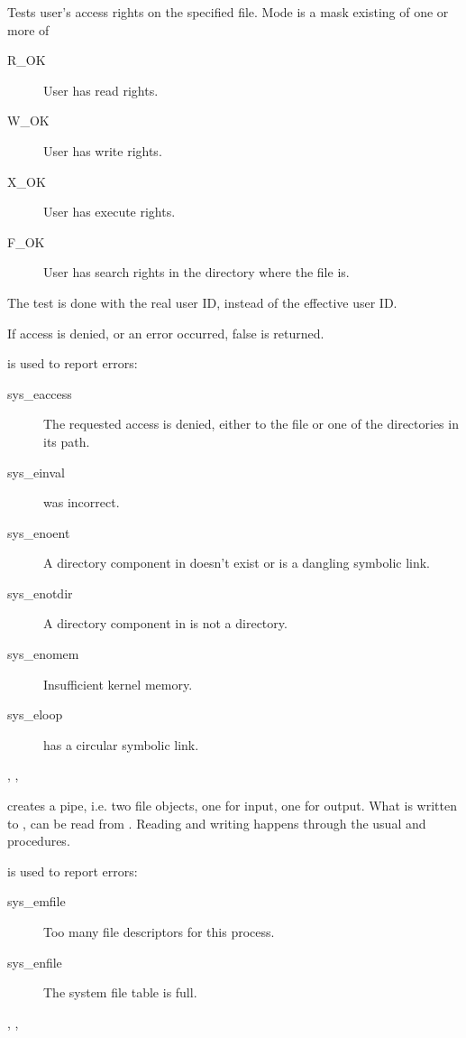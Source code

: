 {
Tests user's access rights on the specified file. Mode is a mask existing of
one or more of
\begin{description}
\item[R\_OK] User has read rights.
\item[W\_OK] User has write rights.
\item[X\_OK] User has execute rights.
\item[F\_OK] User has search rights in the directory where the file is.
\end{description}
The test is done with the real user ID, instead of the effective user ID.

If access is denied, or an error occurred, false is returned.
}
{  is used to report errors:
\begin{description}
\item[sys\_eaccess] The requested access is denied, either to the file or one
of the directories in its path.
\item[sys\_einval]  was incorrect.
\item[sys\_enoent] A directory component in  doesn't exist or is a
dangling symbolic link.
\item[sys\_enotdir] A directory component in  is not a directory.
\item[sys\_enomem] Insufficient kernel memory.
\item[sys\_eloop]  has a circular symbolic link.
\end{description}
}
{, ,  }



{ creates a pipe, i.e. two file objects, one for input, one for output.
What is written to , can be read from .
Reading and writing happens through the usual  and
 procedures.
}
{  is used to report errors:
\begin{description}
\item[sys\_emfile] Too many file descriptors for this process.
\item[sys\_enfile] The system file table is full.
\end{description}
}
{, , }

